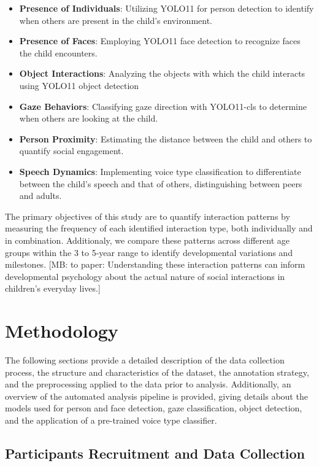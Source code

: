 \documentclass[
  man,floatsintext]{apa6}
\providecommand{\tightlist}{%
  \setlength{\itemsep}{0pt}\setlength{\parskip}{0pt}}
\begin{document}
\begin{itemize}
\tightlist
\item
  \textbf{Presence of Individuals}: Utilizing YOLO11 for person detection to identify when others are present in the child's environment.
\item
  \textbf{Presence of Faces}: Employing YOLO11 face detection to recognize faces the child encounters.
\item
  \textbf{Object Interactions}: Analyzing the objects with which the child interacts using YOLO11 object detection
\item
  \textbf{Gaze Behaviors}: Classifying gaze direction with YOLO11-cls to determine when others are looking at the child.
\item
  \textbf{Person Proximity}: Estimating the distance between the child and others to quantify social engagement.
\item
  \textbf{Speech Dynamics}: Implementing voice type classification to differentiate between the child's speech and that of others, distinguishing between peers and adults.
\end{itemize}

The primary objectives of this study are to quantify interaction patterns by measuring the frequency of each identified interaction type, both individually and in combination. Additionaly, we compare these patterns across different age groups within the 3 to 5-year range to identify developmental variations and milestones. {[}MB: to paper: Understanding these interaction patterns can inform developmental psychology about the actual nature of social interactions in children's everyday lives.{]}

\section{Methodology}\label{methodology}

The following sections provide a detailed description of the data collection process, the structure and characteristics of the dataset, the annotation strategy, and the preprocessing applied to the data prior to analysis. Additionally, an overview of the automated analysis pipeline is provided, giving details about the models used for person and face detection, gaze classification, object detection, and the application of a pre-trained voice type classifier.

\subsection{Participants Recruitment and Data Collection}\label{participants}
\end{document}
